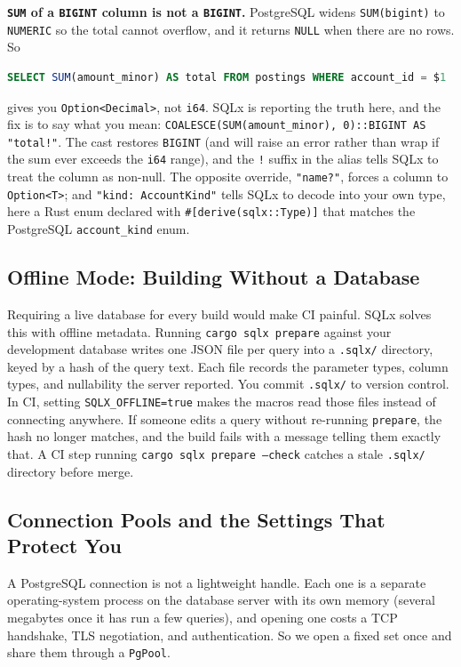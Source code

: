 \begin{trapbox}
\textbf{\texttt{SUM} of a \texttt{BIGINT} column is not a \texttt{BIGINT}.} PostgreSQL widens \texttt{SUM(bigint)} to \texttt{NUMERIC} so the total cannot overflow, and it returns \texttt{NULL} when there are no rows. So
\begin{lstlisting}[language=SQL]
SELECT SUM(amount_minor) AS total FROM postings WHERE account_id = $1
\end{lstlisting}
gives you \texttt{Option<Decimal>}, not \texttt{i64}. SQLx is reporting the truth here, and the fix is to say what you mean: \texttt{COALESCE(SUM(amount\_minor), 0)::BIGINT AS "total!"}. The cast restores \texttt{BIGINT} (and will raise an error rather than wrap if the sum ever exceeds the \texttt{i64} range), and the \texttt{!} suffix in the alias tells SQLx to treat the column as non-null. The opposite override, \texttt{"name?"}, forces a column to \texttt{Option<T>}; and \texttt{"kind: AccountKind"} tells SQLx to decode into your own type, here a Rust enum declared with \texttt{\#[derive(sqlx::Type)]} that matches the PostgreSQL \texttt{account\_kind} enum.
\end{trapbox}

\subsection{Offline Mode: Building Without a Database}

Requiring a live database for every build would make CI painful. SQLx solves this with offline metadata. Running \texttt{cargo sqlx prepare} against your development database writes one JSON file per query into a \texttt{.sqlx/} directory, keyed by a hash of the query text. Each file records the parameter types, column types, and nullability the server reported. You commit \texttt{.sqlx/} to version control. In CI, setting \texttt{SQLX\_OFFLINE=true} makes the macros read those files instead of connecting anywhere. If someone edits a query without re-running \texttt{prepare}, the hash no longer matches, and the build fails with a message telling them exactly that. A CI step running \texttt{cargo sqlx prepare --check} catches a stale \texttt{.sqlx/} directory before merge.

\subsection{Connection Pools and the Settings That Protect You}

A PostgreSQL connection is not a lightweight handle. Each one is a separate operating-system process on the database server with its own memory (several megabytes once it has run a few queries), and opening one costs a TCP handshake, TLS negotiation, and authentication. So we open a fixed set once and share them through a \texttt{PgPool}.

